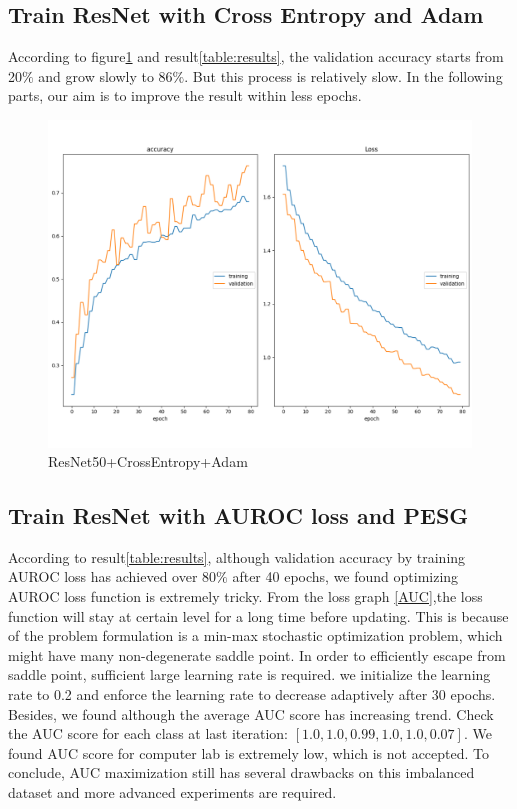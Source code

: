 \documentclass[10pt,twocolumn,letterpaper]{article}
\begin{document}
\subsection{Train ResNet with Cross Entropy and Adam}
According to figure\ref{basline exp} and result\ref{table:results}, the validation accuracy starts from 20$\%$ and grow slowly to 86$\%$. But this process is relatively slow. In the following parts, our aim is to improve the result within less epochs.

\begin{figure}[ht]
    \centering
    \includegraphics[scale = 0.3]{ProgressReport/CE_ResNet.pdf}
    \caption{ResNet50+CrossEntropy+Adam}
    \label{basline exp}
\end{figure}




\subsection{Train ResNet with AUROC loss and PESG}
According to result\ref{table:results}, although validation accuracy by training AUROC loss has achieved over 80$\%$ after 40 epochs, we found optimizing AUROC loss function is extremely tricky. From the loss graph \ref{AUC},the loss function will stay at certain level for a long time before updating. This is because of the problem formulation is a min-max stochastic optimization problem, which might have many non-degenerate saddle point. In order to efficiently escape from saddle point, sufficient large learning rate is required. we initialize the learning rate to 0.2 and enforce the learning rate to decrease adaptively after 30 epochs. \\
Besides, we found although the average AUC score has increasing trend. Check the AUC score for each class at last iteration: $\left [ 1.0, 1.0, 0.99,1.0,1.0,0.07 \right ]$. We found AUC score for computer lab is extremely low, which is not accepted. To conclude, AUC maximization still has several drawbacks on this imbalanced dataset and more advanced experiments are required.
\end{document}

